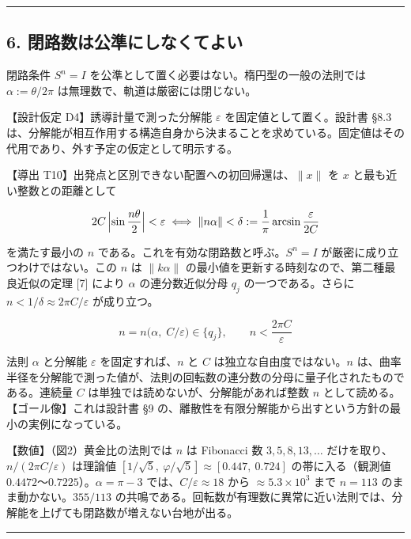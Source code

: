 \documentclass[
  a4paper,
]{ltjsarticle}
\begin{document}
\begin{center}\rule{0.5\linewidth}{0.5pt}\end{center}

\subsection{6.
閉路数は公準にしなくてよい}\label{ux9589ux8defux6570ux306fux516cux6e96ux306bux3057ux306aux304fux3066ux3088ux3044}

閉路条件 \(S^n=I\) を公準として置く必要はない。楕円型の一般の法則では
\(\alpha:=\theta/2\pi\) は無理数で、軌道は厳密には閉じない。

【設計仮定 D4】誘導計量で測った分解能 \(\varepsilon\)
を固定値として置く。設計書 §8.3
は、分解能が相互作用する構造自身から決まることを求めている。固定値はその代用であり、外す予定の仮定として明示する。

【導出 T10】出発点と区別できない配置への初回帰還は、\(\|x\|\) を \(x\)
と最も近い整数との距離として

\[
2C\,\Bigl\lvert\sin\frac{n\theta}{2}\Bigr\rvert<\varepsilon\iff\|n\alpha\|<\delta:=\frac1\pi\arcsin\frac{\varepsilon}{2C}
\]

を満たす最小の \(n\) である。これを有効な閉路数と呼ぶ。\(S^n=I\)
が厳密に成り立つわけではない。この \(n\) は \(\|k\alpha\|\)
の最小値を更新する時刻なので、第二種最良近似の定理 {[}7{]} により
\(\alpha\) の連分数近似分母 \(q_j\) の一つである。さらに
\(n<1/\delta\approx2\pi C/\varepsilon\) が成り立つ。

\[
\boxed{\;n=n\bigl(\alpha,\;C/\varepsilon\bigr)\in\{q_j\},\qquad n<\frac{2\pi C}{\varepsilon}\;}
\]

法則 \(\alpha\) と分解能 \(\varepsilon\) を固定すれば、\(n\) と \(C\)
は独立な自由度ではない。\(n\)
は、曲率半径を分解能で測った値が、法則の回転数の連分数の分母に量子化されたものである。連続量
\(C\) は単独では読めないが、分解能があれば整数 \(n\)
として読める。【ゴール像】これは設計書 §9
の、離散性を有限分解能から出すという方針の最小の実例になっている。

【数値】（図2）黄金比の法則では \(n\) は Fibonacci 数 \(3,5,8,13,\dots\)
だけを取り、\(n/(2\pi C/\varepsilon)\) は理論値
\([1/\sqrt5,\ \varphi/\sqrt5]\approx[0.447,\ 0.724]\) の帯に入る（観測値
\(0.4472\)〜\(0.7225\)）。\(\alpha=\pi-3\)
では、\(C/\varepsilon\approx18\) から \(\approx5.3\times10^{3}\) まで
\(n=113\) のまま動かない。\(355/113\)
の共鳴である。回転数が有理数に異常に近い法則では、分解能を上げても閉路数が増えない台地が出る。

\begin{center}\rule{0.5\linewidth}{0.5pt}\end{center}
\end{document}
